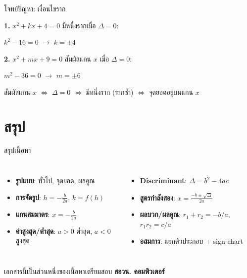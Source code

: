 \documentclass[11pt, aspectratio=169]{beamer}
\begin{document}
\begin{frame}{โจทย์ปัญหา: เงื่อนไขราก}
  \begin{exambox}[ตัวอย่าง]
    \textbf{1.} $x^2 + kx + 4 = 0$ มีหนึ่งรากเมื่อ $\Delta = 0$:

    $k^2 - 16 = 0$ \quad $\rightarrow$ \quad $k = \pm 4$

    \medskip
    \textbf{2.} $x^2 + mx + 9 = 0$ สัมผัสแกน $x$ เมื่อ $\Delta = 0$:

    $m^2 - 36 = 0$ \quad $\rightarrow$ \quad $m = \pm 6$
  \end{exambox}

  \begin{intuition}[สรุป]
    สัมผัสแกน $x$ $\iff$ $\Delta = 0$ $\iff$ มีหนึ่งราก (รากซํ้า) $\iff$ จุดยอดอยู่บนแกน $x$
  \end{intuition}
\end{frame}

\section{สรุป}

\begin{frame}{สรุปเนื้อหา}
  \begin{explanation}[สิ่งที่ได้เรียนรู้]
    \begin{columns}[T]
        \begin{itemize}
          \item \textbf{รูปแบบ}: ทั่วไป, จุดยอด, ผลคูณ
          \item \textbf{การจัดรูป}: $h = -\frac{b}{2a}$, $k = f(h)$
          \item \textbf{แกนสมมาตร}: $x = -\frac{b}{2a}$
          \item \textbf{ค่าสูงสุด/ตํ่าสุด}: $a>0$ ตํ่าสุด, $a<0$ สูงสุด
        \end{itemize}
        \begin{itemize}
          \item \textbf{Discriminant}: $\Delta = b^2-4ac$
          \item \textbf{สูตรกำลังสอง}: $x = \frac{-b \pm \sqrt{\Delta}}{2a}$
          \item \textbf{ผลบวก/ผลคูณ}: $r_1+r_2 = -b/a$, $r_1r_2 = c/a$
          \item \textbf{อสมการ}: แยกตัวประกอบ + sign chart
        \end{itemize}
    \end{columns}
  \end{explanation}
  \begin{center}
    \large เอกสารนี้เป็นส่วนหนึ่งของเนื้อหาเตรียมสอบ \textbf{สอวน. คอมพิวเตอร์}
  \end{center}
\end{frame}
\end{document}
